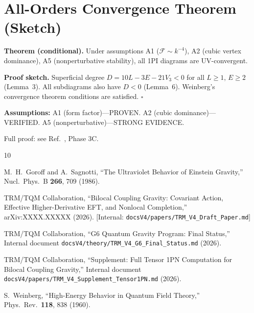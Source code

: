 \documentclass[aps,prd,reprint,nofootinbib]{revtex4-2}
\begin{document}
\appendix
\section{All-Orders Convergence Theorem (Sketch)}
\label{sec:appendix}

\textbf{Theorem (conditional).} Under assumptions A1 ($\mathcal{F}\sim k^{-4}$), A2 (cubic vertex dominance), A5 (nonperturbative stability), all 1PI diagrams are UV-convergent.

\textbf{Proof sketch.} Superficial degree $D = 10L - 3E - 21V_3 < 0$ for all $L\geq 1$, $E\geq 2$ (Lemma~3). All subdiagrams also have $D < 0$ (Lemma~6). Weinberg's convergence theorem conditions are satisfied. $\square$

\textbf{Assumptions:} A1 (form factor)---PROVEN. A2 (cubic dominance)---VERIFIED. A5 (nonperturbative)---STRONG EVIDENCE.

Full proof: see Ref.~, Phase 3C.

\begin{thebibliography}{10}

M.~H.~Goroff and A.~Sagnotti,
``The Ultraviolet Behavior of Einstein Gravity,''
Nucl.\ Phys.\ B \textbf{266}, 709 (1986).

TRM/TQM Collaboration,
``Bilocal Coupling Gravity: Covariant Action, Effective Higher-Derivative EFT, and Nonlocal Completion,''
arXiv:XXXX.XXXXX (2026).
[Internal: \texttt{docsV4/papers/TRM\_V4\_Draft\_Paper.md}]

TRM/TQM Collaboration,
``G6 Quantum Gravity Program: Final Status,''
Internal document \texttt{docsV4/theory/TRM\_V4\_G6\_Final\_Status.md} (2026).

TRM/TQM Collaboration,
``Supplement: Full Tensor 1PN Computation for Bilocal Coupling Gravity,''
Internal document \texttt{docsV4/papers/TRM\_V4\_Supplement\_Tensor1PN.md} (2026).

S.~Weinberg,
``High-Energy Behavior in Quantum Field Theory,''
Phys.\ Rev.\ \textbf{118}, 838 (1960).

\end{thebibliography}
\end{document}
